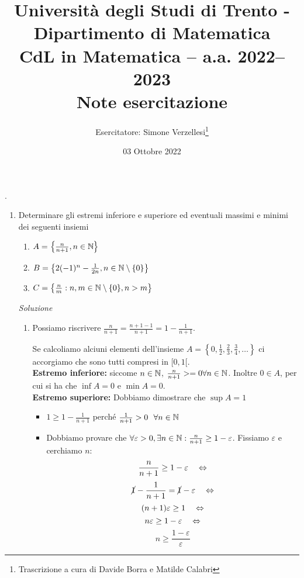 \documentclass{article}
\title{Università degli Studi di Trento - Dipartimento di Matematica\\
CdL in Matematica – a.a. 2022–2023\\ Note esercitazione}
\author{Esercitatore: Simone Verzellesi\thanks{Trascrizione a cura di Davide Borra e Matilde Calabri}}
\date{03 Ottobre 2022}
\begin{document}
\maketitle
{}
\setlength{\headheight}{30pt}.
\begin{enumerate}[label=\textbf{Esercizio 3.\arabic*.},itemindent=*]
    \item Determinare gli estremi inferiore e superiore ed eventuali massimi e minimi dei seguenti insiemi 
    \begin{enumerate}
        \item $A=\left\{\frac{n}{n+1},n\in \mathbb{N}\right\}$
        \item $B=\left\{2(-1)^n-\frac{1}{2n}, n\in \mathbb{N}\setminus \{0\}\right\}$
        \item $C=\left\{\frac{n}{m}: n, m\in \mathbb{N}\setminus\{0\},n>m\right\}$
    \end{enumerate}
    \item[\textit{\large Soluzione~}]~
    \begin{enumerate}
        \item \begin{oss}
            Possiamo riscrivere $\frac{n}{n+1}=\frac{n+1-1}{n+1}=1-\frac{1}{n+1}$.
        \end{oss}
        Se calcoliamo alciuni elementi dell'insieme $A=\left\{0, \frac{1}{2}, \frac{2}{3}, \frac{3}{4},\dots\right\}$ ci accorgiamo che sono tutti compresi in $[0,1[$.\\
        \textbf{Estremo inferiore:} siccome $n\in \mathbb{N}$, $\frac{n}{n+1}>=0\forall n\in \mathbb{N}$. Inoltre $0\in A$, per cui si ha che $\inf A=0$ e $\min A=0$.\\
        \textbf{Estremo superiore:} Dobbiamo dimostrare che $\sup A=1$
        \begin{itemize}
            \item $1\geq 1-\frac{1}{n+1}$ perché $\frac{1}{n+1}>0~~\forall n\in \mathbb{N}$
            \item Dobbiamo provare che $\forall \varepsilon >0, \exists n\in \mathbb{N}:\frac{n}{n+1}\geq 1-\varepsilon$. Fissiamo $\varepsilon$ e cerchiamo $n$: \[\frac{n}{n+1}\geq 1-\varepsilon~~~\Leftrightarrow\]\[\cancel{1}-\frac{1}{n+1}=\cancel{1}-\varepsilon~~~\Leftrightarrow\]\[(n+1)\varepsilon\geq 1~~~\Leftrightarrow\]\[n\varepsilon\geq 1-\varepsilon ~~~\Leftrightarrow\]\[n\geq \frac{1-\varepsilon}{\varepsilon}\]

\end{itemize}
\end{enumerate}
\end{enumerate}
\end{document}
